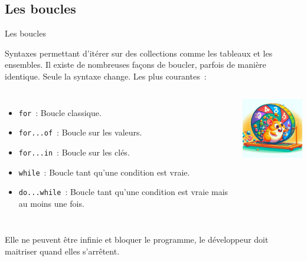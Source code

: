\documentclass{beamer}
\begin{document}
    \subsection{Les boucles}\label{subsec:boucles}

    \begin{frame}{Les boucles}
        \begin{small}
            Syntaxes permettant d'itérer sur des collections comme les tableaux et les ensembles.
            \bigbreak
            Il existe de nombreuses façons de boucler, parfois de manière identique.
            Seule la syntaxe change.
            \bigbreak
            Les plus courantes~:
            \begin{columns}
                \begin{itemize}
                    \item \lstinline{for}~: Boucle classique.
                    \item \lstinline{for...of}~: Boucle sur les valeurs.
                    \item \lstinline{for...in}~: Boucle sur les clés.
                    \item \lstinline{while}~: Boucle tant qu'une condition est vraie.
                    \item \lstinline{do...while}~: Boucle tant qu'une condition est vraie mais au moins une fois.
                \end{itemize}
                \centering
                \includegraphics[width=3.5cm]{image/hamster-running}
            \end{columns}
            \flushleft
            Elle ne peuvent être infinie et bloquer le programme, le développeur doit maitriser quand elles s'arrêtent.
        \end{small}
    \end{frame}
\end{document}
